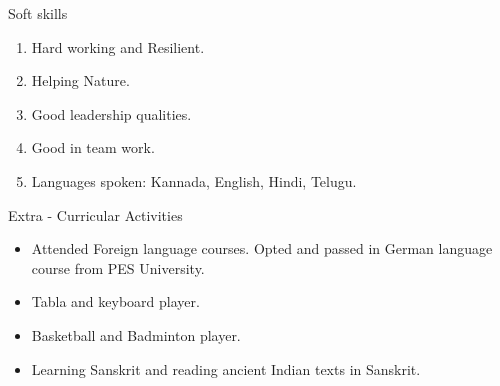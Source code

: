 \documentclass{resume} %
\begin{document}
\vskip 0.5in

\begin{rSection}{Soft skills}
\begin{enumerate}
    \item Hard working and Resilient.
    \item Helping Nature.
    \item Good leadership qualities.
    \item Good in team work.
    \item Languages spoken: Kannada, English, Hindi, Telugu.
\end{enumerate}
\end{rSection}

\vskip 0.5in

\begin{rSection}{Extra - Curricular Activities}
\begin{itemize}
    \item Attended Foreign language courses. Opted and passed in German language course from PES University.
    \item Tabla and keyboard player.
    \item Basketball and Badminton player.
    \item Learning Sanskrit and reading ancient Indian texts in Sanskrit.
\end{itemize}
\end{rSection}
\end{document}

